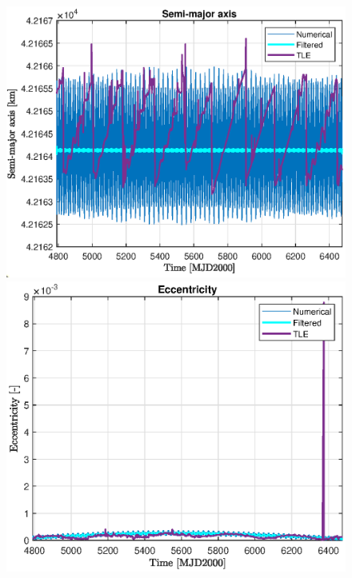 \begin{figure}[H]
	\begin{minipage}{0.48\linewidth}
		\centering
		\includegraphics[width=\n\linewidth]{a_TLE.eps}
	\end{minipage}\hfill
	\begin{minipage}{0.48\linewidth}
		\centering
		\includegraphics[width=\n\linewidth]{e_TLE.eps}
	\end{minipage}
	\vfill
	\begin{minipage}{0.48\linewidth}
		\centering

\end{minipage}
\end{figure}
